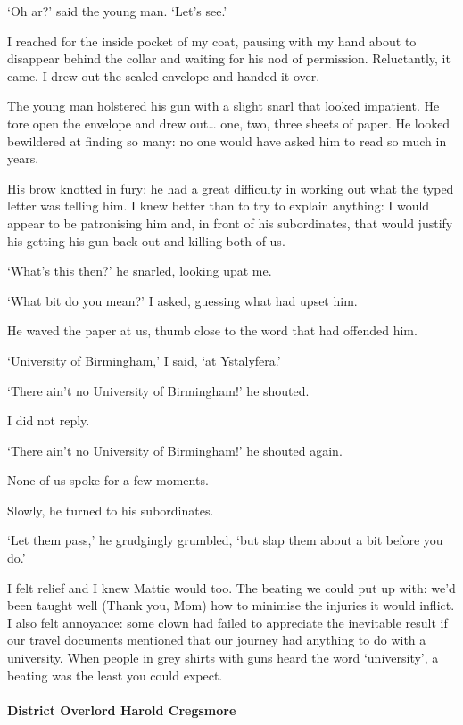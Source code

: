 ‘Oh ar?’ said the young man.  ‘Let’s see.’

I reached for the inside pocket of my coat, pausing with my hand about
to disappear behind the collar and waiting for his nod of permission.
Reluctantly, it came.  I drew out the sealed envelope and handed it
over.

The young man holstered his gun with a slight snarl that looked
impatient.  He tore open the envelope and drew out… one, two, three
sheets of paper.  He looked bewildered at finding so many: no one
would have asked him to read so much in years.

His brow knotted in fury: he had a great difficulty in working out
what the typed letter was telling him.  I knew better than to try to
explain anything: I would appear to be patronising him and, in front
of his subordinates, that would justify his getting his gun back out
and killing both of us.

‘What’s this then?’ he snarled, looking up\=at me.

‘What bit do you mean?’ I asked, guessing what had upset him.

He waved the paper at us, thumb close to the word that had offended him.

‘University of Birmingham,’ I said, ‘at Ystalyfera.’

‘There ain’t no University of Birmingham!’ he shouted.

I did not reply.

‘There ain’t no University of Birmingham!’ he shouted again.

None of us spoke for a few moments.

Slowly, he turned to his subordinates.

‘Let them pass,’ he grudgingly grumbled, ‘but slap them about a bit
before you do.’

I felt relief and I knew Mattie would too.  The beating we could put
up with: we’d been taught well (Thank you, Mom) how to minimise the
injuries it would inflict.  I also felt annoyance: some clown had
failed to appreciate the inevitable result if our travel documents
mentioned that our journey had anything to do with a university.  When
people in grey shirts with guns heard the word ‘university’, a beating
was the least you could expect.


\fugue

\paragraph{District Overlord Harold Cregsmore}\strut


